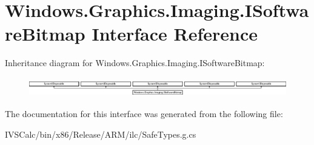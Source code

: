 \hypertarget{interface_windows_1_1_graphics_1_1_imaging_1_1_i_software_bitmap}{}\section{Windows.\+Graphics.\+Imaging.\+I\+Software\+Bitmap Interface Reference}
\label{interface_windows_1_1_graphics_1_1_imaging_1_1_i_software_bitmap}
Inheritance diagram for Windows.\+Graphics.\+Imaging.\+I\+Software\+Bitmap\+:\begin{figure}[H]
\begin{center}
\leavevmode
\includegraphics[height=0.842105cm]{interface_windows_1_1_graphics_1_1_imaging_1_1_i_software_bitmap}
\end{center}
\end{figure}


The documentation for this interface was generated from the following file\+:\begin{DoxyCompactItemize}
\item 
I\+V\+S\+Calc/bin/x86/\+Release/\+A\+R\+M/ilc/Safe\+Types.\+g.\+cs\end{DoxyCompactItemize}
